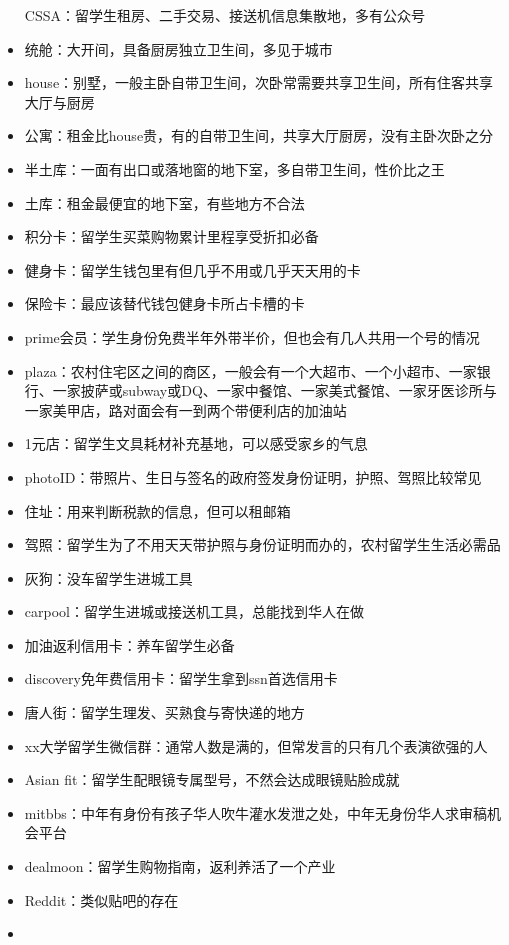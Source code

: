 \documentclass[]{tufte-book}
\begin{document}
\begin{itemize}
  CSSA：留学生租房、二手交易、接送机信息集散地，多有公众号
\item
  统舱：大开间，具备厨房独立卫生间，多见于城市
\item
  house：别墅，一般主卧自带卫生间，次卧常需要共享卫生间，所有住客共享大厅与厨房
\item
  公寓：租金比house贵，有的自带卫生间，共享大厅厨房，没有主卧次卧之分
\item
  半土库：一面有出口或落地窗的地下室，多自带卫生间，性价比之王
\item
  土库：租金最便宜的地下室，有些地方不合法
\item
  积分卡：留学生买菜购物累计里程享受折扣必备
\item
  健身卡：留学生钱包里有但几乎不用或几乎天天用的卡
\item
  保险卡：最应该替代钱包健身卡所占卡槽的卡
\item
  prime会员：学生身份免费半年外带半价，但也会有几人共用一个号的情况
\item
  plaza：农村住宅区之间的商区，一般会有一个大超市、一个小超市、一家银行、一家披萨或subway或DQ、一家中餐馆、一家美式餐馆、一家牙医诊所与一家美甲店，路对面会有一到两个带便利店的加油站
\item
  1元店：留学生文具耗材补充基地，可以感受家乡的气息
\item
  photoID：带照片、生日与签名的政府签发身份证明，护照、驾照比较常见
\item
  住址：用来判断税款的信息，但可以租邮箱
\item
  驾照：留学生为了不用天天带护照与身份证明而办的，农村留学生生活必需品
\item
  灰狗：没车留学生进城工具
\item
  carpool：留学生进城或接送机工具，总能找到华人在做
\item
  加油返利信用卡：养车留学生必备
\item
  discovery免年费信用卡：留学生拿到ssn首选信用卡
\item
  唐人街：留学生理发、买熟食与寄快递的地方
\item
  xx大学留学生微信群：通常人数是满的，但常发言的只有几个表演欲强的人
\item
  Asian fit：留学生配眼镜专属型号，不然会达成眼镜贴脸成就
\item
  mitbbs：中年有身份有孩子华人吹牛灌水发泄之处，中年无身份华人求审稿机会平台
\item
  dealmoon：留学生购物指南，返利养活了一个产业
\item
  Reddit：类似贴吧的存在
\item

\end{itemize}
\end{document}
